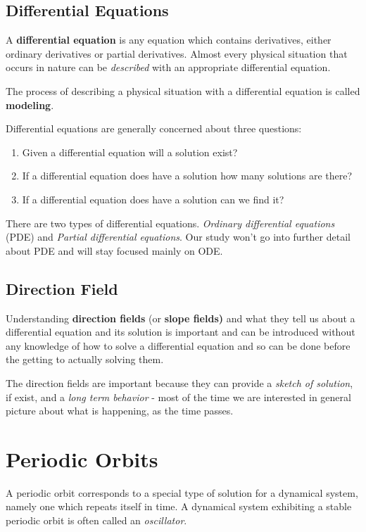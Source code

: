 \documentclass[journal]{IEEEtran}
\begin{document}
\subsection{Differential Equations}
A \textbf{differential equation} is any equation which contains derivatives, either ordinary derivatives or partial derivatives. Almost every physical situation that occurs in nature can be \textit{described} with an appropriate differential equation. 

The process of describing a physical situation with a differential equation is called \textbf{modeling}.

Differential equations are generally concerned about three questions:
\begin{enumerate}
\item Given a differential equation will a solution exist? 
\item If a differential equation does have a solution how many solutions are there?
\item If a differential equation does have a solution can we find it?
\end{enumerate}

There are two types of differential equations. \textit{Ordinary differential equations} (PDE) and \textit{Partial differential equations}. Our study won't go into further detail about PDE and will stay focused mainly on ODE.


\subsection{Direction Field}
Understanding \textbf{direction fields} (or \textbf{slope fields)} and what they tell us about a differential equation and its solution is important and can be introduced without any knowledge of how to solve a differential equation and so can be done before the getting to actually solving them. 



The direction fields are important because they can provide a \textit{sketch of solution}, if exist, and a \textit{long term behavior} - most of the time we are interested in general picture about what is happening, as the time passes.

\section{Periodic Orbits}
A periodic orbit corresponds to a special type of solution for a dynamical system, namely one which repeats itself in time. A dynamical system exhibiting a stable periodic orbit is often called an \textit{oscillator}. 
\end{document}
